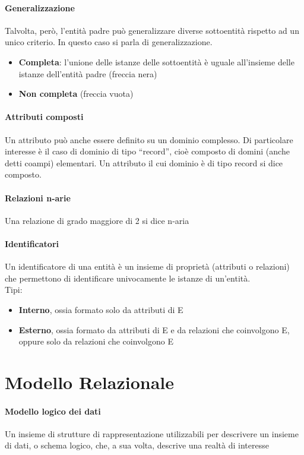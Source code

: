\documentclass[12pt]{article}
\begin{document}
    \paragraph{Generalizzazione}
    Talvolta, però, l’entità padre può generalizzare diverse sottoentità rispetto ad un unico criterio. In questo caso si parla di generalizzazione.
    \begin{itemize}
        \item \textbf{Completa}: l’unione delle istanze delle sottoentità è uguale all’insieme delle istanze dell’entità padre (freccia nera)
        \item \textbf{Non completa} (freccia vuota)
    \end{itemize}
    \paragraph{Attributi composti}
    Un attributo può anche essere definito su un dominio complesso. Di particolare interesse è il caso di dominio di tipo “record”, cioè composto di domini (anche detti coampi) elementari. Un attributo il cui dominio è di tipo record si dice composto.
    \paragraph{Relazioni n-arie}
    Una relazione di grado maggiore di 2 si dice n-aria
    \paragraph{Identificatori}
    Un identificatore di una entità è un insieme di proprietà (attributi o relazioni) che permettono di identificare univocamente le istanze di un’entità.
    \\Tipi:
    \begin{itemize}
        \item \textbf{Interno}, ossia formato solo da attributi di E
        \item \textbf{Esterno}, ossia formato da attributi di E e da relazioni che coinvolgono E, oppure solo da relazioni che coinvolgono E
    \end{itemize}
    \newpage
    \section{Modello Relazionale}
    \paragraph{Modello logico dei dati}
    Un insieme di strutture di rappresentazione utilizzabili per descrivere un insieme di dati, o schema logico, che, a sua volta, descrive una realtà di interesse
\end{document}
